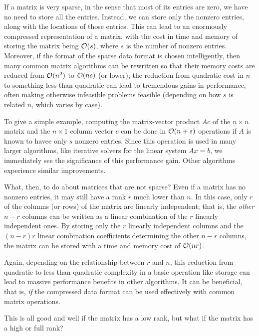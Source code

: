 \documentclass{article}
\begin{document}
	
	If a matrix is very sparse, in the sense that most of its entries are zero, we have no need to store all the entries. Instead, we can store only the nonzero entries, along with the locations of those entries. This can lead to an enormously compressed representation of a matrix, with the cost in time and memory of storing the matrix being $\mathcal{O}(s)$, where $s$ is the number of nonzero entries. Moreover, if the format of the sparse data format is chosen intelligently, then many common matrix algorithms can be rewritten so that their memory costs are reduced from $\mathcal{O}(n^2)$ to  $\mathcal{O}(ns)$ (or lower); the reduction from quadratic cost in $n$ to something less than quadratic can lead to tremendous gains in performance, often making otherwise infeasible problems feasible (depending on how $s$ is related $n$, which varies by case).
	
	To give a simple example, computing the matrix-vector product $Ac$ of the $n\times n$ matrix and the $n\times 1$ column vector $c$ can be done in $\mathcal{O}(n + s)$ operations if $A$ is known to havee only $s$ nonzero entries. Since this operation is used in many larger algorithms, like iterative solvers for the linear system $Ax = b$, we immediately see the significance of this performance gain. Other algorithms experience similar improvements.
	
	What, then, to do about matrices that are not sparse? Even if a matrix has no nonzero entries, it may still have a rank $r$ much lower than $n$. In this case, only $r$ of the columns (or rows) of the matrix are linearly independent; that is, the \textit{other} $n -r$ columns can be written as a linear combination of the $r$ linearly independent ones. By storing only the $r$ linearly independent columns and the $(n-r)r$ linear combination coefficients determining the other $n-r$ columns, the matrix can be stored with a time and memory cost of $\mathcal{O}(nr)$.
	
	Again, depending on the relationship between $r$ and $n$, this reduction from quadratic to less than quadratic complexity in a basic operation like storage can lead to massive performance benefits in other algorithms. It can be beneficial, that is, \textit{if} the compressed data format can be used effectively with common matrix operations.
	
	This is all good and well if the matrix has a low rank, but what if the matrix has a high or full rank?
	
	
\end{document}
